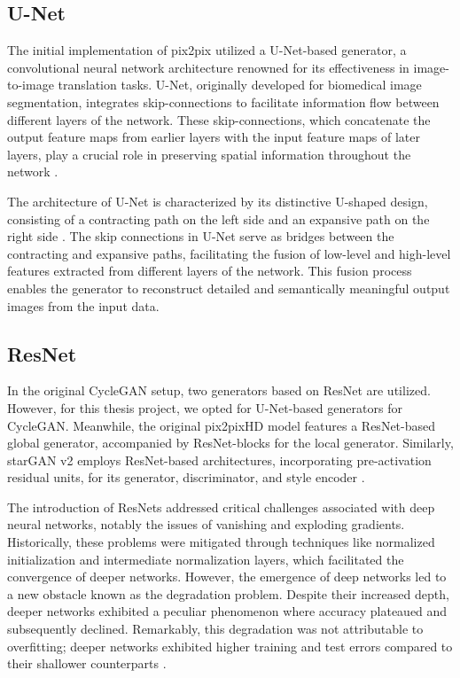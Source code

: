 \documentclass[UKenglish,12pt]{master-style}
\begin{document}
\subsection{U-Net}

The initial implementation of pix2pix utilized a U-Net-based generator, a convolutional neural network architecture renowned for its effectiveness in image-to-image translation tasks. U-Net, originally developed for biomedical image segmentation, integrates skip-connections to facilitate information flow between different layers of the network. These skip-connections, which concatenate the output feature maps from earlier layers with the input feature maps of later layers, play a crucial role in preserving spatial information throughout the network \cite{ZUNAIR2021104699} .

The architecture of U-Net is characterized by its distinctive U-shaped design, consisting of a contracting path on the left side and an expansive path on the right side \cite{ZUNAIR2021104699} . The skip connections in U-Net serve as bridges between the contracting and expansive paths, facilitating the fusion of low-level and high-level features extracted from different layers of the network. This fusion process enables the generator to reconstruct detailed and semantically meaningful output images from the input data. 

\subsection{ResNet}

In the original CycleGAN setup, two generators based on ResNet are utilized. However, for this thesis project, we opted for U-Net-based generators for CycleGAN. Meanwhile, the original pix2pixHD model features a ResNet-based global generator, accompanied by ResNet-blocks for the local generator. Similarly, starGAN v2 employs ResNet-based architectures, incorporating pre-activation residual units, for its generator, discriminator, and style encoder \cite{ResNet} .

The introduction of ResNets addressed critical challenges associated with deep neural networks, notably the issues of vanishing and exploding gradients. Historically, these problems were mitigated through techniques like normalized initialization and intermediate normalization layers, which facilitated the convergence of deeper networks. However, the emergence of deep networks led to a new obstacle known as the degradation problem. Despite their increased depth, deeper networks exhibited a peculiar phenomenon where accuracy plateaued and subsequently declined. Remarkably, this degradation was not attributable to overfitting; deeper networks exhibited higher training and test errors compared to their shallower counterparts \cite{ResNet}.
\end{document}
